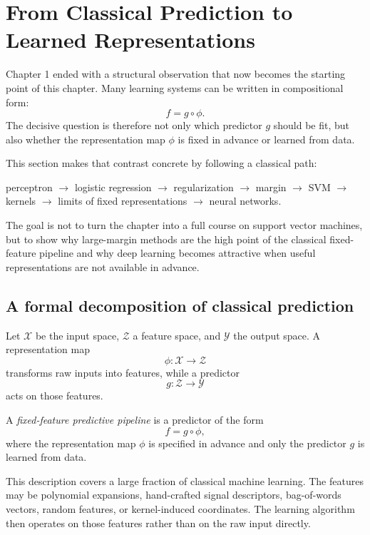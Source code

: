 \section{From Classical Prediction to Learned Representations}

Chapter 1 ended with a structural observation that now becomes the starting point of this chapter. Many learning systems can be written in compositional form:
\[
f = g\circ \phi.
\]
The decisive question is therefore not only which predictor $g$ should be fit, but also whether the representation map $\phi$ is fixed in advance or learned from data.

This section makes that contrast concrete by following a classical path:
\begin{center}
perceptron $\to$ logistic regression $\to$ regularization $\to$ margin $\to$ SVM $\to$ kernels $\to$ limits of fixed representations $\to$ neural networks.
\end{center}
The goal is not to turn the chapter into a full course on support vector machines, but to show why large-margin methods are the high point of the classical fixed-feature pipeline and why deep learning becomes attractive when useful representations are not available in advance.

\subsection*{A formal decomposition of classical prediction}

Let $\mathcal X$ be the input space, $\mathcal Z$ a feature space, and $\mathcal Y$ the output space. A representation map
\[
\phi:\mathcal X\to\mathcal Z
\]
transforms raw inputs into features, while a predictor
\[
g:\mathcal Z\to\mathcal Y
\]
acts on those features.

\begin{definition}
A \emph{fixed-feature predictive pipeline} is a predictor of the form
\[
f = g\circ \phi,
\]
where the representation map $\phi$ is specified in advance and only the predictor $g$ is learned from data.
\end{definition}

This description covers a large fraction of classical machine learning. The features may be polynomial expansions, hand-crafted signal descriptors, bag-of-words vectors, random features, or kernel-induced coordinates. The learning algorithm then operates on those features rather than on the raw input directly.


